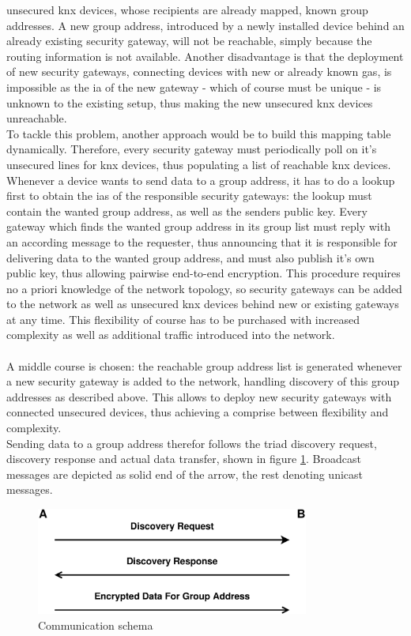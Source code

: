 unsecured \gls{knx} devices, whose recipients are already mapped, known group addresses. A new group address, introduced by a newly installed device behind
an already existing security gateway, will not be reachable, simply because the routing information is not available. 
Another disadvantage is that the deployment of new
security gateways, connecting devices with new or already known \glspl{ga}, is impossible as the \gls{ia} of the new gateway - which of
course must be unique - is unknown to the existing setup, thus making the new unsecured \gls{knx} devices unreachable.
\\
To tackle this problem, another approach would be to build this mapping table dynamically. Therefore, every security gateway must periodically poll
on it's unsecured lines for \gls{knx} devices, thus populating a list of reachable \gls{knx} devices. Whenever a 
device wants to send data to a group address, it has to do a lookup first to obtain the \glspl{ia} of the responsible security gateways: the lookup
must contain the wanted group address, as well as the senders public key.
Every 
gateway which finds the wanted group address in its group list must reply with an according message to the requester, thus announcing that it is responsible
for delivering data to the wanted group address, and must also publish it's own public key, thus allowing pairwise end-to-end encryption.
This procedure requires no a priori knowledge of
the network topology, so security gateways can be added to the network as well as unsecured \gls{knx} devices behind new or existing gateways at any time. This
flexibility of course has to be purchased with increased complexity as well as additional traffic introduced into the network.
\\
\\
A middle course is chosen: the reachable group address list is generated whenever a new security gateway is added to the network,
 handling discovery of this group addresses as described
above. This allows to deploy new security gateways with connected unsecured devices, thus achieving a comprise between flexibility and complexity. 
\\
Sending data to a group address therefor follows the triad discovery request, discovery response and actual data transfer, shown in figure \ref{fig:prot1}. Broadcast
messages are depicted as solid end of the arrow, the rest denoting unicast messages.
\begin{figure}
  \centering
    \includegraphics[width=0.8\textwidth]{figures/protokoll1.eps}
 \caption{Communication schema}
 \label{fig:prot1}
\end{figure}
